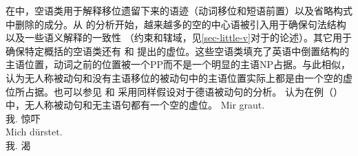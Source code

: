 在\gbtc 中，空语类用于解释移位遗留下来的语迹（动词移位和短语前置）以及省略构式中删除的成分。从 \citet{Larson88a}的分析开始，越来越多的空的中心语被引入用于确保句法结构以及一些语义解释的一致性 （约束和辖域，见\ref{sec-little-v}对于\littlevc 的论述）。其它用于确保特定概括的空语类还有 \citet[]{Coopmans-89a-u}和 \citet[Chapter~1]{Postal2004a-u}提出的虚位。这些空语类填充了英语中倒置结构的主语位置，动词之前的位置被一个PP而不是一个明显的主语NP占据。与此相似， \citet[]{Grewendorf93}认为无人称被动句和没有主语移位的被动句中的主语位置实际上都是由一个空的虚位所占据。也可以参见 和 \citet[]{Lohnstein2014a}采用同样假设对于德语被动句的分析。 \citet[\S~II.3.3.3]{Sternefeld2006a-u}认为在例（）中，无人称被动句和无主语句都有一个空的虚位。
\eal
\ex 
\gll Mir graut.\\
	 我.\dat{} 惊吓\\
\ex 
\gll Mich dürstet.\\
	我.\acc{} 渴\\
\zl

